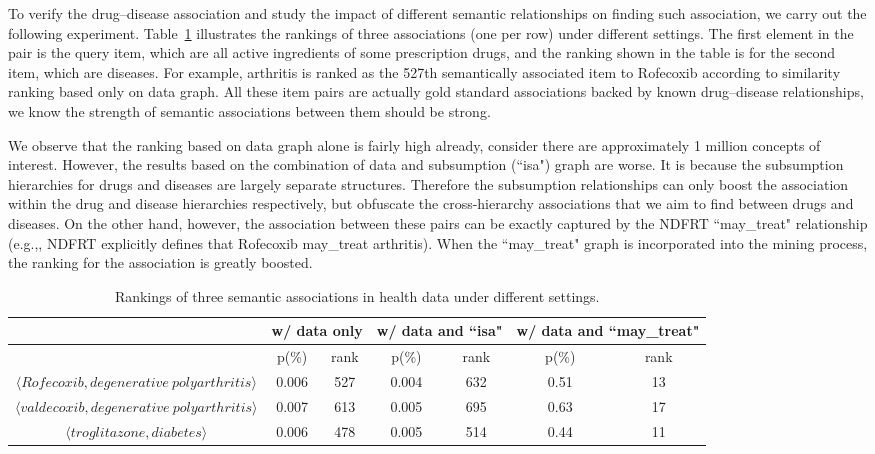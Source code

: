 To verify the drug--disease association and study the impact of different semantic relationships on finding such association, we carry out the following experiment. Table~\ref{tbl:health_exp} illustrates the rankings of three associations (one per row) under different settings. The first element in the pair is the query item, which are all active ingredients of some prescription drugs, and the ranking shown in the table is for the second item, which are diseases. For example, arthritis is ranked as the 527th semantically associated item to Rofecoxib according to similarity ranking based only on data graph. All these item pairs are actually gold standard associations backed by known drug--disease relationships, we know the strength of semantic associations between them should be strong.

We observe that the ranking based on data graph alone is fairly high already, consider there are approximately 1 million concepts of interest. However, the results based on the combination of data and subsumption (``isa") graph are worse. It is because the subsumption hierarchies for drugs and diseases are largely separate structures. Therefore the subsumption relationships can only boost the association within the drug and disease hierarchies respectively, but obfuscate the cross-hierarchy associations that we aim to find between drugs and diseases. On the other hand, however, the association between these pairs can be exactly captured by the NDFRT ``may\_treat" relationship (e.g.,, NDFRT explicitly defines that Rofecoxib may\_treat arthritis). When the ``may\_treat" graph is incorporated into the mining process, the ranking for the association is greatly boosted.

\begin{table}[tbh]\scriptsize
\begin{center}
\begin{tabular}{ c || c  c || c  c || c  c }
\hline
        &   \multicolumn{2}{c||}{w/ data only}  &   \multicolumn{2}{c||}{w/ data and ``isa"} & \multicolumn{2}{c}{w/ data and ``may\_treat"}\\
\hline
\hline
                        	&   p(\%)   &   rank    &   p(\%)    &   rank    &   p(\%)    &    rank    \\
\hline
$\langle Rofecoxib, degenerative~polyarthritis\rangle$  &   0.006   &   527     &   0.004    &   632     &   0.51     &     13     \\
$\langle valdecoxib, degenerative~polyarthritis\rangle$  &   0.007   &   613     &   0.005    &   695     &   0.63     &     17     \\
$\langle troglitazone, diabetes\rangle$  &   0.006   &   478     &   0.005    &   514     &   0.44     &     11     \\
\hline
\end{tabular}
\end{center}
\caption[Rankings of three semantic associations in health data under\protect\newline different settings]{\label{tbl:health_exp}Rankings of three semantic associations in health data under different settings.}
\end{table}





